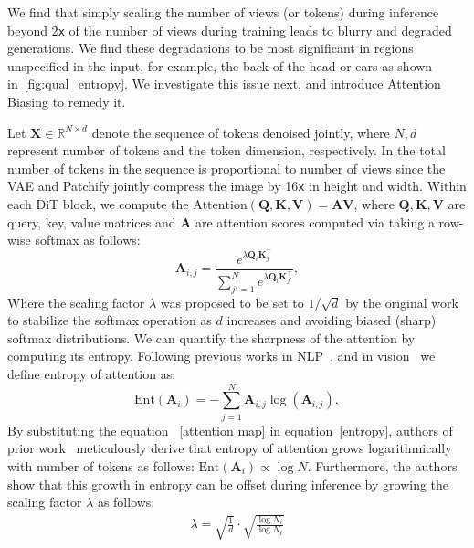 We find that simply scaling the number of views (or tokens) during inference beyond 2\texttt{x} of the number of views during training leads to blurry and degraded generations. We find these degradations to be most significant in regions unspecified in the input, for example, the back of the head or ears as shown in~\cref{fig:qual_entropy}. We investigate this issue next, and introduce Attention Biasing to remedy it. 


 Let $\textbf{X} \in \mathbb{R}^{N \times d}$ denote the sequence of tokens denoised jointly, where $N, d$ represent number of tokens and the token dimension, respectively. In \ourmodel the total number of tokens in the sequence is proportional to number of views since the VAE and Patchify jointly compress the image by 16\texttt{x} in height and width. Within each DiT block, we compute the $\textrm{Attention}(\textbf{Q}, \textbf{K}, \textbf{V}) = \textbf{A}\textbf{V}$, where  $\textbf{Q},\textbf{K},\textbf{V}$ are query, key, value matrices and $\textbf{A}$ are attention scores computed via taking a row-wise softmax as follows:
\begin{equation}
    \textbf{A}_{i, j} = \frac{e ^{\lambda \textbf{Q}_{i}\textbf{K}_{j}^{\top}}}{\sum_{j' = 1}^{N} e ^{\lambda \textbf{Q}_{i}\textbf{K}_{j'}^{\top}}}, \label{attention map}
\end{equation}
Where the scaling factor $\lambda$ was proposed to be set to $1 / \sqrt{d}$ by the original work~\cite{vaswani2017attention} to stabilize the softmax operation as $d$ increases and avoiding biased (sharp) softmax distributions. We can quantify the sharpness of the attention by computing its entropy. Following previous works in NLP~\cite{ghader2017does,attanasio2022,zhang2024attention}, and in vision~\cite{jin2023training} we define entropy of attention as:
\begin{equation}
    \textrm{Ent}(\textbf{A}_{i}) = -\sum_{j=1}^{N} \textbf{A}_{i, j} \log (\textbf{A}_{i, j}), \label{entropy}
\end{equation}
By substituting the equation ~\eqref{attention map} in equation~\eqref{entropy}, authors of prior work~\cite{jin2023training} meticulously derive that entropy of attention grows logarithmically with number of tokens as follows: \(\textrm{Ent}(\textbf{A}_{i}) \propto \log N\). Furthermore, the authors show that this growth in entropy can be offset during inference by growing the scaling factor $\lambda$ as follows: 
\begin{equation}
    \begin{aligned}
    \lambda = \sqrt{\frac{1}{d}} \cdot \sqrt{\frac{\log N_i}{\log N_t}}
    \end{aligned}
\end{equation}
